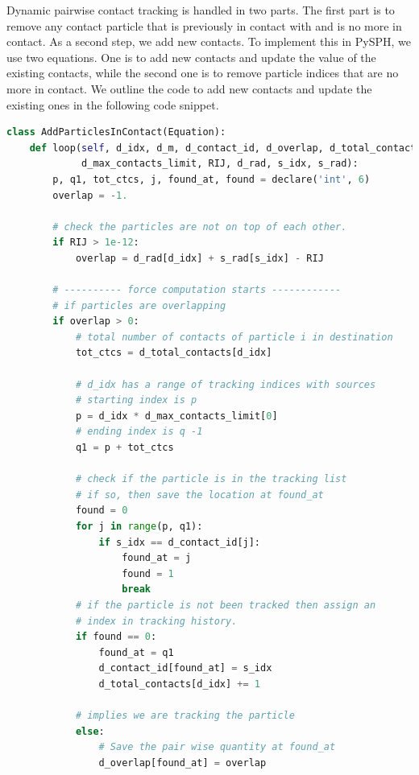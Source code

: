 Dynamic pairwise contact tracking is handled in two parts. The first part is to
remove any contact particle that is previously in contact with and is no more in
contact. As a second step, we add new contacts. To implement this in PySPH, we
use two equations. One is to add new contacts and update the value of the
existing contacts, while the second one is to remove particle indices that are
no more in contact. We outline the code to add new contacts and update the
existing ones in the following code snippet.
 \lstset{basicstyle=\footnotesize\ttfamily}
\begin{lstlisting}[label={code:add_contacts_many},frame=lines,language=Python,upquote=True]
class AddParticlesInContact(Equation):
    def loop(self, d_idx, d_m, d_contact_id, d_overlap, d_total_contacts,
             d_max_contacts_limit, RIJ, d_rad, s_idx, s_rad):
        p, q1, tot_ctcs, j, found_at, found = declare('int', 6)
        overlap = -1.

        # check the particles are not on top of each other.
        if RIJ > 1e-12:
            overlap = d_rad[d_idx] + s_rad[s_idx] - RIJ

        # ---------- force computation starts ------------
        # if particles are overlapping
        if overlap > 0:
            # total number of contacts of particle i in destination
            tot_ctcs = d_total_contacts[d_idx]

            # d_idx has a range of tracking indices with sources
            # starting index is p
            p = d_idx * d_max_contacts_limit[0]
            # ending index is q -1
            q1 = p + tot_ctcs

            # check if the particle is in the tracking list
            # if so, then save the location at found_at
            found = 0
            for j in range(p, q1):
                if s_idx == d_contact_id[j]:
                    found_at = j
                    found = 1
                    break
            # if the particle is not been tracked then assign an
            # index in tracking history.
            if found == 0:
                found_at = q1
                d_contact_id[found_at] = s_idx
                d_total_contacts[d_idx] += 1

            # implies we are tracking the particle
            else:
                # Save the pair wise quantity at found_at
                d_overlap[found_at] = overlap
\end{lstlisting}


